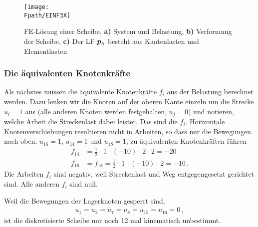 \begin{figure}[tbp] \centering
\if {} \sidecaption \fi
\texttt{[image: \\Fpath/EINF3X]}
\caption{FE-L\"{o}sung einer Scheibe, {\bf a)} System und Belastung, {\bf b)} Verformung der
Scheibe, {\bf c)} Der LF $\mbox{\boldmath $p$}_h$ besteht aus Kantenlasten und Elementlasten}
\label{Einf3}
\end{figure}%


{\textcolor{sectionTitleBlue}{\subsubsection*{Die \"{a}quivalenten Knotenkr\"{a}fte}}}

Als n\"{a}chstes m\"{u}ssen die \"{a}quivalente Knotenkr\"{a}fte $f_i$ aus der Belastung berechnet werden. Dazu lenken wir die Knoten auf der oberen Kante einzeln um die Strecke $u_i = 1$ aus (alle anderen Knoten werden festgehalten, $u_j = 0$) und notieren, welche Arbeit die Streckenlast dabei leistet. Das sind die $f_i$. Horizontale Knotenverschiebungen resultieren nicht in Arbeiten, so dass nur die Bewegungen nach oben, $u_{16} = 1$, $u_{14} = 1$ und $u_{18} = 1$,  zu \"{a}quivalenten Knotenkr\"{a}ften f\"{u}hren
\begin{subequations}
\begin{align}
f_{14} &= \frac{1}{2}\cdot \, 1\, \cdot (-10) \cdot \,2\cdot \,2 = - 20\\
f_{16} &= f_{18} = \frac{1}{2}\cdot \, 1\, \cdot (-10) \cdot \,2 = - 10\,.
\end{align}
\end{subequations}
Die Arbeiten $f_i$ sind negativ, weil Streckenlast und Weg  entgegengesetzt gerichtet sind. Alle anderen $f_i$ sind null.

Weil die Bewegungen der Lagerknoten gesperrt sind,
\begin{align}
u_1 = u_2 = u_7 = u_8 = u_{15} = u_{16} = 0\,,
\end{align}
ist die diskretisierte Scheibe nur noch 12 mal kinematisch unbestimmt.

